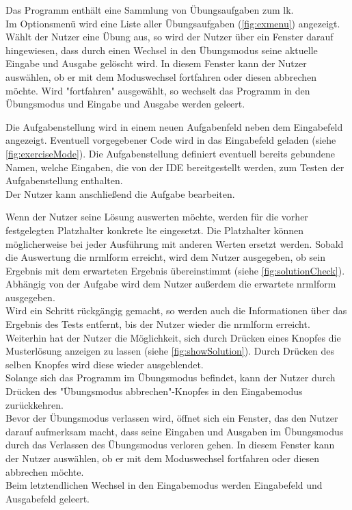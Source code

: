 \documentclass[parskip=full,11pt,twoside]{scrartcl}
\begin{document}
Das Programm enthält eine Sammlung von Übungsaufgaben zum \gls{lk}.\\
Im Optionsmenü wird eine Liste aller Übungsaufgaben (\cref{fig:exmenu}) angezeigt.\\
Wählt der Nutzer eine Übung aus, so wird der Nutzer über ein Fenster darauf hingewiesen, dass durch einen Wechsel in den Übungsmodus seine aktuelle Eingabe und Ausgabe gelöscht wird. In diesem Fenster kann der Nutzer auswählen, ob er mit dem Moduswechsel fortfahren oder diesen abbrechen möchte. Wird "fortfahren" ausgewählt, so wechselt das Programm in den Übungsmodus und Eingabe und Ausgabe werden geleert.

Die Aufgabenstellung wird in einem neuen Aufgabenfeld neben dem Eingabefeld angezeigt. 
Eventuell vorgegebener Code wird in das Eingabefeld geladen (siehe \cref{fig:exerciseMode}).
Die Aufgabenstellung definiert eventuell bereits gebundene Namen, welche Eingaben, die von der IDE bereitgestellt werden, zum Testen der Aufgabenstellung enthalten.\\
Der Nutzer kann anschließend die Aufgabe bearbeiten.
 
Wenn der Nutzer seine Lösung auswerten möchte, werden für die vorher festgelegten Platzhalter konkrete \gls{lt}e eingesetzt. Die Platzhalter können möglicherweise bei jeder Ausführung mit anderen Werten ersetzt werden.
Sobald die Auswertung die \gls{nrmlform} erreicht, wird dem Nutzer ausgegeben, ob sein Ergebnis mit dem erwarteten Ergebnis übereinstimmt (siehe \cref{fig:solutionCheck}). Abhängig von der Aufgabe wird dem Nutzer außerdem die erwartete \gls{nrmlform} ausgegeben.\\
Wird ein Schritt rückgängig gemacht, so werden auch die Informationen über das Ergebnis des Tests entfernt, bis der Nutzer wieder die \gls{nrmlform} erreicht. \\
Weiterhin hat der Nutzer die Möglichkeit, sich durch Drücken eines Knopfes die Musterlösung anzeigen zu lassen (siehe \cref{fig:showSolution}). Durch Drücken des selben Knopfes wird diese wieder ausgeblendet. \\

Solange sich das Programm im Übungsmodus befindet, kann der Nutzer durch Drücken des "Übungsmodus abbrechen"-Knopfes in den Eingabemodus zurückkehren.\\
Bevor der Übungsmodus verlassen wird, öffnet sich ein Fenster, das den Nutzer darauf aufmerksam macht, dass seine Eingaben und Ausgaben im Übungsmodus durch das Verlassen des Übungsmodus verloren gehen. In diesem Fenster kann der Nutzer auswählen, ob er mit dem Moduswechsel fortfahren oder diesen abbrechen möchte. \\
Beim letztendlichen Wechsel in den Eingabemodus werden Eingabefeld und Ausgabefeld geleert.
\end{document}
